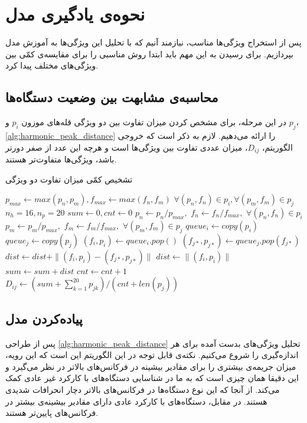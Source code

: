 \section{نحوه‌ی یادگیری مدل}
پس از استخراج ویژگی‌ها مناسب، نیازمند آنیم که با تحلیل این ویژگی‌ها به آموزش مدل بپردازیم. برای رسیدن به این مهم باید ابتدا روش مناسبی را برای مقایسه‌ی کمّی بین ویژگی‌های مختلف پیدا کرد. 

\subsection{محاسبه‌ی مشابهت بین وضعیت دستگاه‌ها}
در این مرحله، برای مشخص کردن میزان تفاوت بین دو ویژگی قله‌های موزون $p_i$ و $p_j$، \cref{alg:harmonic_peak_distance} را ارائه می‌دهیم. لازم به ذکر است که خروجی الگوریتم، $D_{ij}$، میزان عددی تفاوت بین ویژگی‌ها است و هرچه این عدد از صفر دورتر باشد، ویژگی‌ها متفاوت‌تر هستند\cite{jung2017vibration}.

\begin{algorithm}
\caption{تشخیص کمّی میزان تفاوت دو ویژگی}
\label{alg:harmonic_peak_distance}
\begin{latin}
\begin{algorithmic}
\Require $p_{max} \gets max(p_n, p_m), f_{max} \gets max(f_n, f_m)$  $\forall (p_n, f_n) \in p_i, \forall (p_m, f_m) \in p_j$
\Ensure $n_h = 16, n_p = 20$
\State $sum \gets 0, cnt \gets 0$
\State $p_n \gets p_n / p_{max},$  $f_n \gets f_n / f_{max},$  $\forall (p_n, f_n) \in p_i$
\State $p_m \gets p_m / p_{max},$  $f_m \gets f_m / f_{max},$  $\forall (p_m, f_m) \in p_j$
\State $queue_i \gets copy(p_i)$
\State $queue_j \gets copy(p_j)$
\State $(f_i, p_i) \gets queue_i.pop()$
     \State $(f_{j*}, p_{j*}) \gets queue_j.pop(f_{j*})$
     \State $dist \gets dist + \|(f_i, p_i) - (f_{j*}, p_{j*})\|$
\Else
    \State $dist \gets \|(f_i, p_i)\|$
\EndIf
	\State $sum \gets sum + dist$
	\State $cnt \gets cnt + 1$
\EndWhile
\State $D_{ij} \gets (sum + \sum_{k=1}^{20} p_{jk}) / (cnt + len(p_j))$
\end{algorithmic}
\end{latin}
\end{algorithm}

\subsection{پیاده‌کردن مدل}
پس از طراحی \cref{alg:harmonic_peak_distance} تحلیل ویژگی‌های بدست آمده برای هر اندازه‌گیری را شروع می‌کنیم. نکته‌ی قابل توجه در این الگوریتم این است که این رویه، میزان جریمه‌ی بیشتری را برای مقادیر بیشینه در فرکانس‌های بالاتر در نظر می‌گیرد و این دقیقا همان چیزی است که به ما در شناسایی دستگاه‌های با کارکرد غیر عادی کمک می‌کند. از آنجا که این نوع دستگاه‌ها در فرکانس‌های بالاتر دچار انحرافات شدیدی هستند. در مقابل، دستگاه‌های با کارکرد عادی دارای مقادیر بیشینه‌ی بیشتر در فرکانس‌های پایین‌تر هستند.

